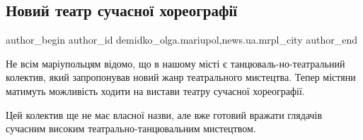  
 
 
 
 
 
\subsection{Новий театр сучасної хореографії}
\label{sec:23_11_2020.stz.news.ua.mrpl_city.1.novyj_teatr_suchasnoi_horeografii}
 
\ifcmt
 author_begin
   author_id demidko_olga.mariupol,news.ua.mrpl_city
 author_end
\fi

Не всім маріупольцям відомо, що в нашому місті є танцюваль\hyp{}но-театральний
колектив, який запропонував новий жанр театрального мистецтва. Тепер містяни
матимуть можливість ходити на вистави театру сучасної хореографії.

Цей колектив ще не має власної назви, але вже готовий вражати глядачів сучасним
високим театрально-танцювальним мистецтвом.



